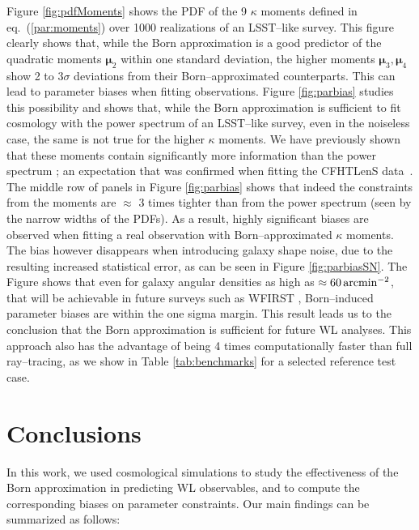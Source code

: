 \documentclass[reprint,aps,prd,superscriptaddress,showkeys,showpacs]{revtex4-1}
\begin{document}
Figure \ref{fig:pdfMoments} shows the PDF of the 9 $\kappa$ moments defined in eq.~(\ref{par:moments}) over 1000 realizations of an LSST--like survey. This figure clearly shows that, while the Born approximation is a good predictor of the quadratic moments $\pmb{\mu}_2$ within one standard deviation, the higher moments $\pmb{\mu}_3,\pmb{\mu}_4$ show 2 to 3$\sigma$ deviations from their Born--approximated counterparts. This can lead to parameter biases when fitting observations. Figure \ref{fig:parbias} studies this possibility and shows that, while the Born approximation is sufficient to fit cosmology with the power spectrum of an LSST--like survey, even in the noiseless case, the same is not true for the higher $\kappa$ moments. We have previously shown that these moments contain significantly more information than the power spectrum \citep{MinkPetri}; an expectation that was confirmed when fitting the CFHTLenS data~\citep{CFHTMink}. The middle row of panels in Figure \ref{fig:parbias} shows that indeed the constraints from the moments are $\approx$ 3 times tighter than from the power spectrum (seen by the narrow widths of the PDFs). As a result, highly significant biases are observed when fitting a real observation with Born--approximated $\kappa$ moments. The bias however disappears when introducing galaxy shape noise, due to the resulting increased statistical error, as can be seen in Figure \ref{fig:parbiasSN}. The Figure shows that even for galaxy angular densities as high as $\approx 60\,{\rm arcmin}^{-2}$, that will be achievable in future surveys such as WFIRST \citep{WFIRST}, Born--induced parameter biases are within the one sigma margin. This result leads us to the conclusion that the Born approximation is sufficient for future WL analyses. This approach also has the advantage of being 4 times computationally faster than full ray--tracing, as we show in Table \ref{tab:benchmarks} for a selected reference test case.  


\section{Conclusions}
\label{sec:conclude}
%
In this work, we used cosmological simulations to study the effectiveness of the Born approximation in predicting WL observables, and to compute the corresponding biases on parameter constraints. Our main findings can be summarized as follows:
\end{document}
